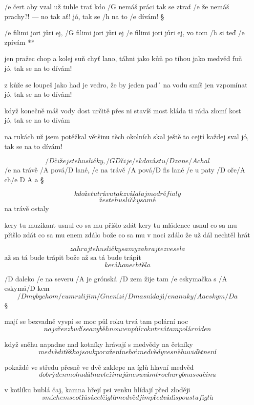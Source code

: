 /e čert aby vzal už tuhle trať
kdo /G nemáš práci tak se ztrať
/e že nemáš prachy?! --- no tak ať!
jó, tak se /h na to /e dívám! \S

\R /e filimi jori jůri ej, /G filimi jori jůri ej
   /e filimi jori jůri ej, vo tom /h si teď /e zpívám **

jen pražec chop a kolej suň
chyť lano, táhni jako kůň
po tíhou jako medvěd fuň
jó, tak se na to dívám! \s

z kůže se loupeš jako had
je vedro, že by jeden pad´
na vodu smíš jen vzpomínat
jó, tak se na to dívám! \s

když konečně máš vody dost
určitě přes ni stavíš most
kláda ti ráda zlomí kost
jó, tak se na to dívám \s

na rukách už jsem potěžkal
většinu těch okolních skal
ještě to cejtí každej sval
jó, tak se na to dívám! \s




\[ /D čiže jste husličky, /{G D} čije
/e kdo vás tu /D zane/A chal \]
/e na trávě /A pová/D lané, /e na trávě /A pová/{D fis} lané
/e u paty /D oře/A ch/{e D A} a \S

\[ kdože tu trávu tak zválal
aj modré fialy \]
\[ že ste husličky samé \]
na trávě ostaly \s

kery tu muzikant usnul
co sa mu přišlo zdát
kery tu mládenec usnul
co sa mu přišlo zdát
co sa mu enem zdálo
bože co sa mu v noci zdálo
že už dál nechtěl hrát \s

\[ zahrajte husličky samy
zahrajte zvesela \]
až sa tá bude trápit
bože až sa tá bude trápit
\[ kerá ho nechtěla \]




/D daleko /e na severu /A je grónská /D zem
žije tam /e eskymačka s /A eskymá/D kem
\[ /D my bychom /e umrzli jim /G není zi/D ma
snídají /e nanuky /A a eskym/D a \]\S

mají se bezvadně vyspí se moc
půl roku trvá tam polární noc
\[ na jaře vzbudí se a vyběhnou ven
půl roku trvá tam polární den \]\s

když sněhu napadne nad kotníky
hrávají s medvědy na četníky
\[ medvědi těžko jsou k poražení
neboť medvědy ve sněhu vidět není \]\s

pokaždé ve středu přesně ve dvě
zaklepe na íglů hlavní medvěd
\[ dobrý den mohu dál na vteřinu
já nesu vám trochu ryb na svačinu \]\s

v kotlíku bublá čaj, kamna hřejí
psi venku hlídají před zloději
\[ smíchem se otřásá celé íglů
medvěd jim předvádí spoustu fíglů \]\s

